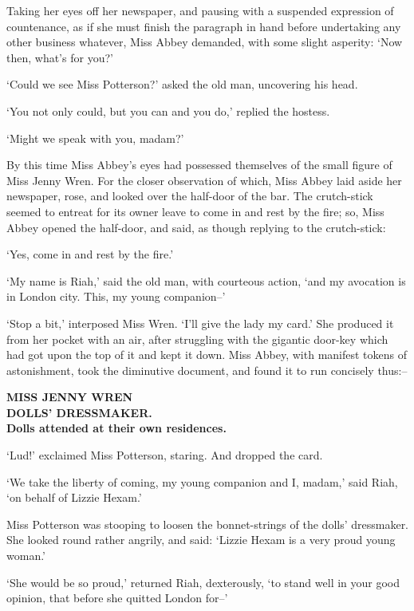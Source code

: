 Taking her eyes off her newspaper, and pausing with a suspended
expression of countenance, as if she must finish the paragraph in hand
before undertaking any other business whatever, Miss Abbey demanded,
with some slight asperity: ‘Now then, what’s for you?’

‘Could we see Miss Potterson?’ asked the old man, uncovering his head.

‘You not only could, but you can and you do,’ replied the hostess.

‘Might we speak with you, madam?’

By this time Miss Abbey’s eyes had possessed themselves of the small
figure of Miss Jenny Wren. For the closer observation of which, Miss
Abbey laid aside her newspaper, rose, and looked over the half-door of
the bar. The crutch-stick seemed to entreat for its owner leave to come
in and rest by the fire; so, Miss Abbey opened the half-door, and said,
as though replying to the crutch-stick:

‘Yes, come in and rest by the fire.’

‘My name is Riah,’ said the old man, with courteous action, ‘and my
avocation is in London city. This, my young companion--’

‘Stop a bit,’ interposed Miss Wren. ‘I’ll give the lady my card.’ She
produced it from her pocket with an air, after struggling with the
gigantic door-key which had got upon the top of it and kept it down.
Miss Abbey, with manifest tokens of astonishment, took the diminutive
document, and found it to run concisely thus:--

\begin{center}
		\textbf{MISS JENNY WREN}\\[10pt]

	       \textbf{DOLLS’ DRESSMAKER.}\\[10pt]

	\textbf{Dolls attended at their own residences.}\\[10pt]
\end{center}

‘Lud!’ exclaimed Miss Potterson, staring. And dropped the card.

‘We take the liberty of coming, my young companion and I, madam,’ said
Riah, ‘on behalf of Lizzie Hexam.’

Miss Potterson was stooping to loosen the bonnet-strings of the dolls’
dressmaker. She looked round rather angrily, and said: ‘Lizzie Hexam is
a very proud young woman.’

‘She would be so proud,’ returned Riah, dexterously, ‘to stand well in
your good opinion, that before she quitted London for--’

